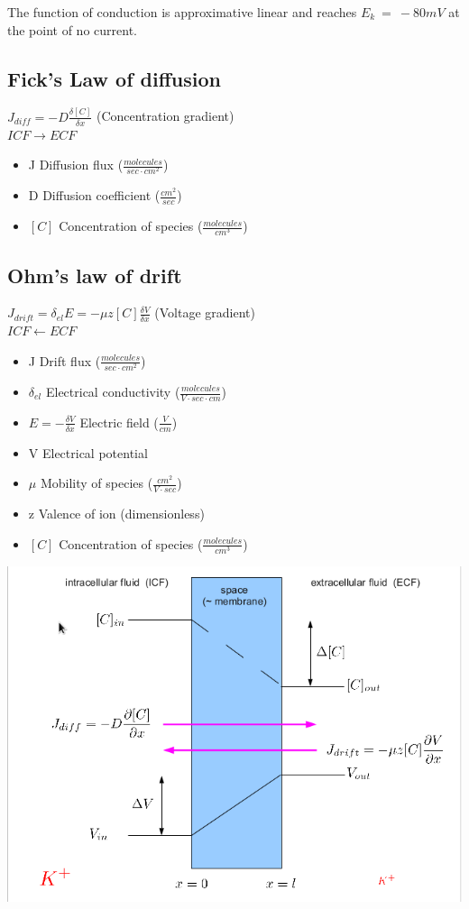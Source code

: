 \documentclass[english,11pt]{article}
\begin{document}
The function of conduction is approximative linear and reaches $E_k~=~-80mV$ at the point of no current.

\subsection{Fick's Law of diffusion}
$J_{diff} = -D \frac{\delta[C]}{\delta x}$ (Concentration gradient)\\
$ICF \rightarrow ECF$\\

\begin{itemize}
\item J Diffusion flux ($\frac{molecules}{sec \cdot cm^2}$)
\item D Diffusion coefficient ($\frac{cm^2}{sec}$)
\item $[C]$ Concentration of species ($\frac{molecules}{cm^3}$)
\end{itemize}

\subsection{Ohm's law of drift}
$J_{drift} = \delta_{el}E = -\mu z [C] \frac{\delta V}{\delta x}$ (Voltage gradient)\\
$ICF \leftarrow ECF$\\

\begin{itemize}
\item J Drift flux ($\frac{molecules}{sec \cdot cm^2}$)
\item $\delta_{el}$ Electrical conductivity ($\frac{molecules}{V \cdot sec \cdot cm}$)
\item $E=-\frac{\delta V}{\delta x}$ Electric field ($\frac{V}{cm}$)
\item V Electrical potential
\item $\mu$ Mobility of species ($\frac{cm^2}{V \cdot sec}$)
\item z Valence of ion (dimensionless)
\item $[C]$ Concentration of species ($\frac{molecules}{cm^3}$)
\end{itemize}

\includegraphics[width=\textwidth]{fluid-equations.png}
\end{document}
